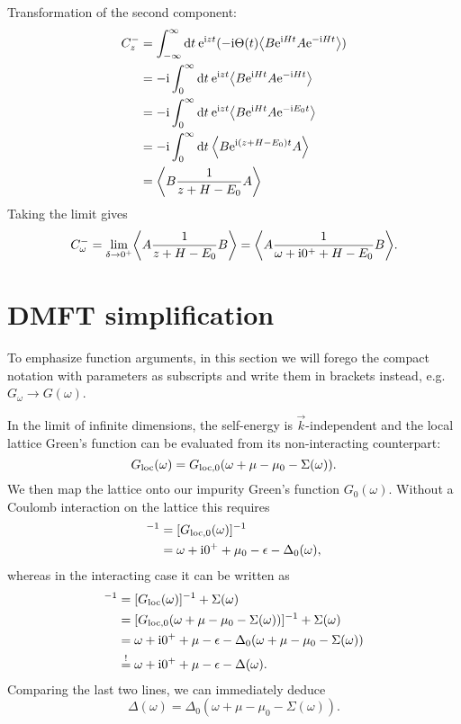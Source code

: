 Transformation of the second component:
\begin{align}
    C^-_z
     & =
    \int_{-\infty}^\infty \md t \>
    \me^{\mi zt}(-\mi \Theta(t) \expval*{B \me^{\mi Ht} A \me^{-\mi Ht}}) \\
     & =
    -\mi \int_0^\infty \md t \>
    \me^{\mi zt} \expval*{B \me^{\mi Ht} A \me^{-\mi Ht}}                 \\
     & =
    -\mi \int_0^\infty \md t \>
    \me^{\mi zt} \expval*{B \me^{\mi Ht} A \me^{-\mi E_0t}}               \\
     & =
    -\mi \int_0^\infty \md t \>
    \expval*{B \me^{\mi(z + H - E_0)t} A}                                 \\
     & =
    \expval*{B \frac{1}{z + H - E_0} A}
\end{align}
Taking the limit gives
\begin{equation}
    C^-_\omega
    =
    \lim_{\delta\to 0^+} \expval*{A \frac{1}{z + H - E_0} B}
    =
    \expval*{A \frac{1}{\omega + \mi0^+ + H - E_0} B}.
\end{equation}

\section{DMFT simplification}
\label{app:dmft-simplification}

To emphasize function arguments,
in this section we will forego the compact notation with parameters as subscripts
and write them in brackets instead,
e.g.\ $G_\omega \to G(\omega)$.

In the limit of infinite dimensions, the self-energy is $\vec{k}$-independent
and the local lattice Green's function can be evaluated from
its non-interacting counterpart:
\begin{equation}
    G_{\mathrm{loc}}(\omega)
    =
    G_{\mathrm{loc},0}(\omega + \mu - \mu_0 - \Sigma(\omega)).
\end{equation}
We then map the lattice onto our impurity Green's function $G_0(\omega)$.
Without a Coulomb interaction on the lattice this requires
\begin{align}
    [G_0(\omega)]^{-1}
     & =
    [G_{\mloc,0}(\omega)]^{-1} \\
     & =
    \omega + \mi0^+ + \mu_0 - \epsilon - \Delta_0(\omega),
\end{align}
whereas in the interacting case it can be written as
\begin{align}
    [G_0(\omega)]^{-1}
     & =
    [G_{\mloc}(\omega)]^{-1} + \Sigma(\omega)                                          \\
     & =
    [G_{\mloc,0}(\omega + \mu - \mu_0 - \Sigma(\omega))]^{-1} + \Sigma(\omega)         \\
     & =
    \omega + \mi0^+ + \mu - \epsilon - \Delta_0(\omega + \mu - \mu_0 - \Sigma(\omega)) \\
     & \stackrel{!}{=}
    \omega + \mi0^+ + \mu - \epsilon - \Delta(\omega).
\end{align}
Comparing the last two lines, we can immediately deduce
\begin{equation}
    \Delta(\omega) = \Delta_0(\omega + \mu - \mu_0 - \Sigma(\omega)).
\end{equation}
